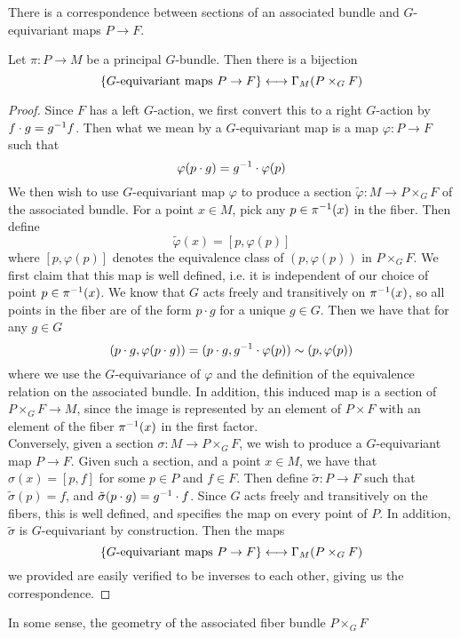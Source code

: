 %
There is a correspondence between sections of an associated bundle and
$G$-equivariant maps $P \to F$.
%
\begin{prop}
Let $\pi : P \to M$ be a principal $G$-bundle. Then there is a bijection
\[
\left\lbrace G\text{-equivariant maps } P \to F \right\rbrace \longleftrightarrow \Gamma_M(P \times_G F)
\]
\end{prop}
%
\begin{proof}
Since $F$ has a left $G$-action, we first convert this to a right $G$-action
by $f \cdot g = g^{-1} f$. Then what we mean by a $G$-equivariant map is
a map $\varphi : P \to F$ such that
\[
\varphi(p\cdot g) = g^{-1}\cdot \varphi(p)
\]
We then wish to use $G$-equivariant map $\varphi$ to produce a section
$\tilde{\varphi} : M \to P \times_G F$ of the associated bundle. For a
point $x \in M$, pick any $p \in \pi^{-1}(x)$ in the fiber. Then define
\[
\tilde{\varphi}(x) = [p, \varphi(p)]
\]
where $[p, \varphi(p)]$ denotes the equivalence class of $(p, \varphi(p))$ in
$P \times_G F$. We first claim that this map is well defined, i.e. it is
independent of our choice of point $p \in \pi^{-1}(x)$. We know that $G$ acts
freely and transitively on $\pi^{-1}(x)$, so all points in the fiber are of
the form $p \cdot g$ for a unique $g \in G$. Then we have that for any $g \in G$
\[
(p\cdot g, \varphi(p \cdot g)) = (p \cdot g, g^{-1} \cdot \varphi(p)) \sim (p, \varphi(p))
\]
where we use the $G$-equivariance of $\varphi$ and the definition of the equivalence
relation on the associated bundle. In addition, this induced map is
a section of $P \times_G F \to M$, since the image is represented by an
element of $P \times F$ with an element of the fiber $\pi^{-1}(x)$ in the first
factor. \\

Conversely, given a section $\sigma : M \to P \times_G F$, we wish to produce
a $G$-equivariant map $P \to F$. Given such a section, and a point $x \in M$,
we have that $\sigma(x) = [p, f]$ for some $p \in P$ and $f \in F$. Then
define $\tilde{\sigma} : P \to F$ such that $\tilde{\sigma}(p) = f$, and
$\tilde{\sigma}(p \cdot g) = g^{-1} \cdot f$. Since $G$ acts freely and transitively
on the fibers, this is well defined, and specifies the map on every
point of $P$. In addition, $\tilde{\sigma}$ is $G$-equivariant by construction.
Then the maps
\[
\left\lbrace G\text{-equivariant maps } P \to F \right\rbrace \longleftrightarrow \Gamma_M(P \times_G F)
\]
we provided are easily verified to be inverses to each other, giving us the
correspondence.
\end{proof}
%
In some sense, the geometry of the associated fiber bundle $P \times_G F$
